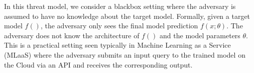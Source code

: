 In this threat model, we consider a blackbox setting where the adversary is assumed to have no knowledge about the target model.
Formally, given a target model $f()$, the adversary only sees the final model prediction $f(x;\theta)$.
The adversary does not know the architecture of $f()$ and the model parameters $\theta$.
This is a practical setting seen typically in Machine Learning as a Service (MLaaS) where the adversary submits an input query to the trained model on the Cloud via an API and receives the corresponding output.







